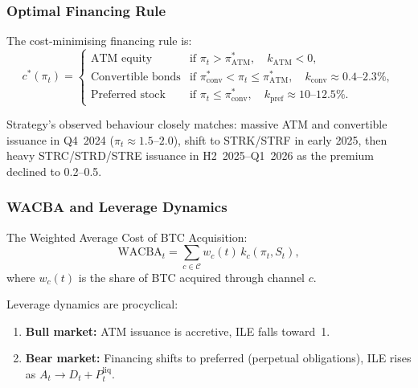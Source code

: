 \subsubsection{Optimal Financing Rule}

\begin{proposition}\label{prop:optimal_channel}
  The cost-minimising financing rule is:
  \begin{equation}
    \label{eq:optimal_channel}
    c^*(\pi_t) =
    \begin{cases}
      \text{ATM equity} & \text{if } \pi_t > \pi^*_{\mathrm{ATM}},
        \quad k_{\mathrm{ATM}} < 0, \\[4pt]
      \text{Convertible bonds} & \text{if } \pi^*_{\mathrm{conv}} < \pi_t
        \le \pi^*_{\mathrm{ATM}},
        \quad k_{\mathrm{conv}} \approx 0.4\text{--}2.3\%, \\[4pt]
      \text{Preferred stock} & \text{if } \pi_t \le \pi^*_{\mathrm{conv}},
        \quad k_{\mathrm{pref}} \approx 10\text{--}12.5\%.
    \end{cases}
  \end{equation}
\end{proposition}

Strategy's observed behaviour closely matches: massive ATM and convertible
issuance in Q4~2024 ($\pi_t \approx 1.5$--$2.0$), shift to STRK/STRF in
early 2025, then heavy STRC/STRD/STRE issuance in H2~2025--Q1~2026 as the
premium declined to 0.2--0.5.

\subsubsection{WACBA and Leverage Dynamics}

\begin{definition}[WACBA]\label{def:wacba}
  The Weighted Average Cost of BTC Acquisition:
  \begin{equation}
    \mathrm{WACBA}_t = \sum_{c \in \mathcal{C}} w_c(t)\, k_c(\pi_t, S_t),
  \end{equation}
  where $w_c(t)$ is the share of BTC acquired through channel $c$.
\end{definition}

\begin{proposition}\label{prop:procyclical}
  Leverage dynamics are procyclical:
  \begin{enumerate}
    \item \textbf{Bull market:} ATM issuance is accretive, ILE falls toward~1.
    \item \textbf{Bear market:} Financing shifts to preferred (perpetual
      obligations), ILE rises as $A_t \to D_t + P_t^{\mathrm{liq}}$.
  \end{enumerate}
\end{proposition}

